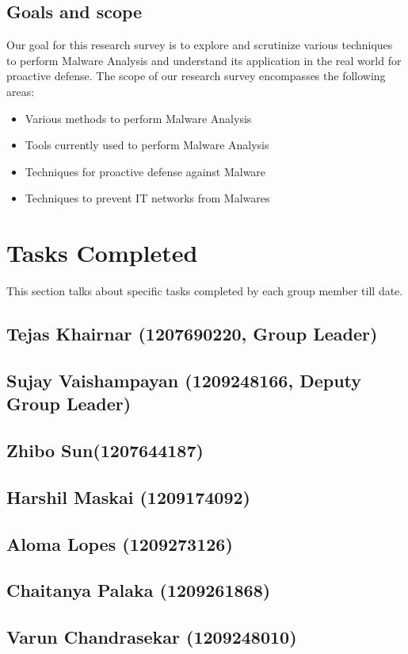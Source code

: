 \documentclass[14pt]{article}
\begin{document}
	\subsection{Goals and scope}
	Our goal for this research survey is to explore and scrutinize various techniques to perform Malware Analysis and understand its application in the real world for proactive defense.
	The scope of our research survey encompasses the following areas:
	\begin{itemize}
		\item{Various methods to perform Malware Analysis}
		\item{Tools currently used to perform Malware Analysis} 
		\item{Techniques for proactive defense against Malware}
		\item{Techniques to prevent IT networks from Malwares}
	\end{itemize}
	
	\section{Tasks Completed}
	This section talks about specific tasks completed by each group member till date.
		\subsection{Tejas Khairnar (1207690220, Group Leader)}
		\subsection{Sujay Vaishampayan (1209248166, Deputy Group Leader)}
		\subsection{Zhibo Sun(1207644187)}
		\subsection{Harshil Maskai (1209174092)}
		\subsection{Aloma Lopes (1209273126)}
		\subsection{Chaitanya Palaka (1209261868)}
		\subsection{Varun Chandrasekar (1209248010)}
\end{document}
